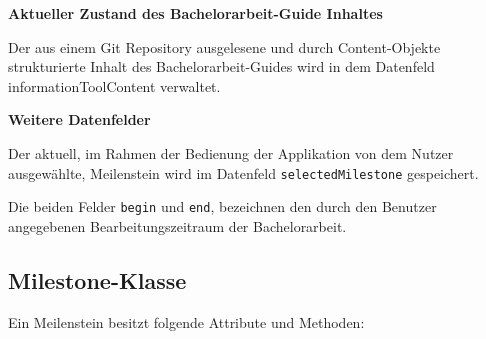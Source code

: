 \documentclass[bibliography=totoc,listof=totoc,BCOR=5mm,DIV=12,oneside]{scrbook}
\begin{document}
\par \bigskip \textbf{Aktueller Zustand des Bachelorarbeit-Guide Inhaltes}
\par Der aus einem Git Repository ausgelesene und durch Content-Objekte strukturierte Inhalt des Bachelorarbeit-Guides wird in dem Datenfeld informationToolContent verwaltet.

\par \bigskip \textbf{Weitere Datenfelder}
\par Der aktuell, im Rahmen der Bedienung der Applikation von dem Nutzer ausgewählte, Meilenstein wird im Datenfeld \texttt{selectedMilestone} gespeichert. 
\par \medskip Die beiden Felder \texttt{begin} und \texttt{end}, bezeichnen den durch den Benutzer angegebenen Bearbeitungszeitraum der Bachelorarbeit.

\newpage
\subsection{Milestone-Klasse}
\par Ein Meilenstein besitzt folgende Attribute und Methoden:
\end{document}
